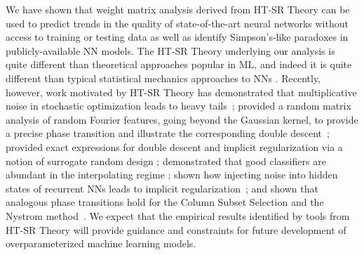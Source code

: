 \documentclass{article}
\newcommand{\michael}[1]{{\color{red}\sf{[Michael: #1]}}}
\begin{document}
\michael{I may cut this stuff.}
We have shown that weight matrix analysis derived from HT-SR Theory can be used to predict trends in the quality of state-of-the-art neural networks without access to training or testing data as well as identify Simpson's-like paradoxes in publicly-available NN models.
The HT-SR Theory underlying our analysis is quite different than theoretical approaches popular in ML, and indeed it is quite different than typical statistical mechanics approaches to NNs \citep{BKPx20}.
Recently, however, work motivated by HT-SR Theory has 
demonstrated that multiplicative noise in stochastic optimization leads to heavy tails~\citep{HodMah20A_TR,GSZ20_TR}; 
provided a random matrix analysis of random {F}ourier features, going beyond the {G}aussian kernel, to provide a precise phase transition and illustrate the corresponding double descent~\citep{ZCM20_TR}; 
provided exact expressions for double descent and implicit regularization via a notion of surrogate random design \citep{DLM19_Exact_TR}; 
demonstrated that good classifiers are abundant in the interpolating regime \citep{TKM20_TR};
shown how injecting noise into hidden states of recurrent NNs leads to implicit regularization~\citep{LEHM21_TR,Mah12}; and 
shown that analogous phase transitions hold for the {C}olumn {S}ubset {S}election and the {N}ystrom method~\citep{DKM20_TR}. 
We expect that the empirical results identified by tools from HT-SR Theory will provide guidance and constraints for future development of overparameterized machine learning models.




\end{document}
